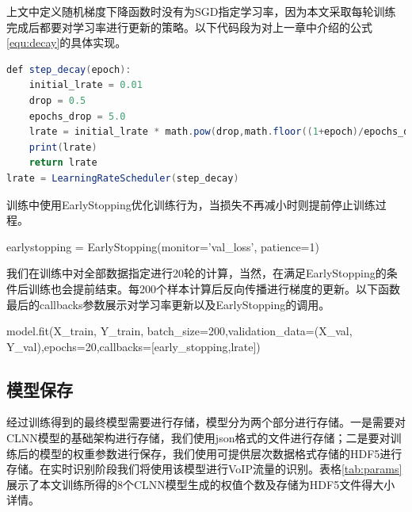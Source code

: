 上文中定义随机梯度下降函数时没有为SGD指定学习率，因为本文采取每轮训练完成后都要对学习率进行更新的策略。以下代码段为对上一章中介绍的公式\ref{equ:decay}的具体实现。
\begin{lstlisting}[breaklines=true,language={Java},frame=single,basicstyle=\small\monaco,label={lst:storm},
keywordstyle=\color{blue!70},
rulesepcolor=\color{red!20!green!20!blue!20},escapeinside=``,
xleftmargin=1.5em,xrightmargin=1.5em, aboveskip=1em]
def step_decay(epoch):
    initial_lrate = 0.01
    drop = 0.5
    epochs_drop = 5.0
    lrate = initial_lrate * math.pow(drop,math.floor((1+epoch)/epochs_drop))
    print(lrate)
    return lrate
lrate = LearningRateScheduler(step_decay)
\end{lstlisting}  

训练中使用EarlyStopping优化训练行为，当损失不再减小时则提前停止训练过程。
\begin{center}
\monaco
earlystopping = EarlyStopping(monitor='val\_loss', patience=1)
\end{center}

我们在训练中对全部数据指定进行20轮的计算，当然，在满足EarlyStopping的条件后训练也会提前结束。每200个样本计算后反向传播进行梯度的更新。以下函数最后的callbacks参数展示对学习率更新以及EarlyStopping的调用。
\begin{center}
\monaco
model.fit(X\_train, Y\_train, batch\_size=200,validation\_data=(X\_val, Y\_val),epochs=20,callbacks=[early\_stopping,lrate])
\end{center}


\subsection{模型保存}
经过训练得到的最终模型需要进行存储，模型分为两个部分进行存储。一是需要对CLNN模型的基础架构进行存储，我们使用json格式的文件进行存储；二是要对训练后的模型的权重参数进行保存，我们使用可提供层次数据格式存储的HDF5进行存储。在实时识别阶段我们将使用该模型进行VoIP流量的识别。表格\ref{tab:params}展示了本文训练所得的8个CLNN模型生成的权值个数及存储为HDF5文件得大小详情。

